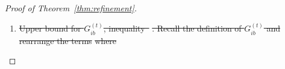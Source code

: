 \documentclass[lettersize,onecolumn,journal]{IEEEtran}
\theoremstyle{definition}
\theoremstyle{definition}
\newcommand{\of}[1]{\left(#1\right)}
\newcommand{\ang}[1]{\left\langle#1\right\rangle}
\providecommand{\DIFdeltex}[1]{{\protect\color{red}\sout{#1}}}                      %
\providecommand{\DIFdel}[1]{\texorpdfstring{\DIFdeltex{#1}}{}} %
\begin{document}
\begin{proof}[Proof of Theorem~\ref{thm:refinement}]
\begin{enumerate}
\item%
\DIFdel{Upper bound for $G_{ib}^{(t)}$, inequality~}%
\DIFdel{. Recall the definition of $G_{ib}^{(t)}$ and rearrange the terms
    }%
\DIFdel{where 
    }%


\end{enumerate}
\end{proof}
\end{document}

